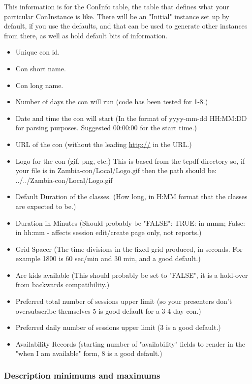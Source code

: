 \documentclass[captions=tablesignature]{scrartcl}
\begin{document}
This information is for the ConInfo table, the table that defines
what your particular ConInstance is like.  There will be an
"Initial" instance set up by default, if you use the defaults, and
that can be used to generate other instances from there, as well
as hold default bits of information.
\begin{itemize}
\item Unique con id.
\item Con short name.
\item Con long name.
\item Number of days the con will run (code has been tested for 1-8.)
\item Date and time the con will start (In the format of yyyy-mm-dd
HH:MM:DD for parsing purposes.  Suggested 00:00:00 for the
start time.)
\item URL of the con (without the leading \url{http://} in the URL.)
\item Logo for the con (gif, png, etc.)  This is based from the tcpdf
directory so, if your file is in Zambia-con/Local/Logo.gif then
the path should be: ../../Zambia-con/Local/Logo.gif
\item Default Duration of the classes. (How long, in H:MM format that
the classes are expected to be.)
\item Duration in Minutes (Should probably be "FALSE": TRUE: in mmm;
False: in hh:mm - affects session edit/create page only, not
reports.)
\item Grid Spacer (The time divisions in the fixed grid produced, in
seconds.  For example 1800 is 60 sec/min and 30 min, and a good
default.)
\item Are kids available (This should probably be set to "FALSE", it
is a hold-over from backwards compatibility.)
\item Preferred total number of sessions upper limit (so your
presenters don't oversubscribe themselves 5 is good default for
a 3-4 day con.)
\item Preferred daily number of sessions upper limit (3 is a good
default.)
\item Availability Records (starting number of "availability" fields
to render in the "when I am available" form, 8 is a good
default.)
\end{itemize}

\subsubsection{Description minimums and maximums}
\label{sec-1-2-5}
\end{document}
